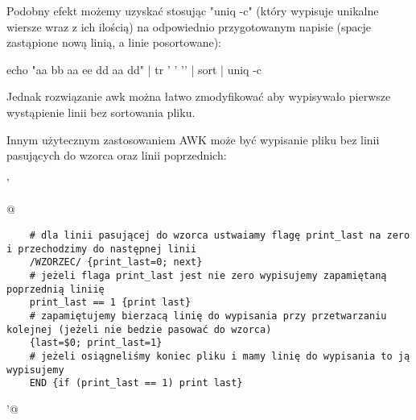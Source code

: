 Podobny efekt możemy uzyskać stosując "uniq -c" (który wypisuje unikalne wiersze wraz z ich ilością)
na odpowiednio przygotowanym napisie (spacje zastąpione nową linią, a linie posortowane):

\begin{CodeFrame*}[bash]{}
echo "aa bb aa ee dd aa dd" | tr ' ' '\n' | sort | uniq -c
\end{CodeFrame*}
Jednak rozwiązanie awk można łatwo zmodyfikować aby wypisywało pierwsze wystąpienie linii bez sortowania pliku.

Innym użytecznym zastosowaniem AWK może być wypisanie pliku bez linii pasujących do wzorca oraz linii poprzednich:

\begin{oframed}\noindent{}\Verb@ '{@\vspace{-0.95em}
\begin{verbatim}
	# dla linii pasującej do wzorca ustwaiamy flagę print_last na zero i przechodzimy do następnej linii
	/WZORZEC/ {print_last=0; next}
	# jeżeli flaga print_last jest nie zero wypisujemy zapamiętaną poprzednią liniię
	print_last == 1 {print last}
	# zapamiętujemy bierzacą linię do wypisania przy przetwarzaniu kolejnej (jeżeli nie bedzie pasować do wzorca)
	{last=$0; print_last=1}
	# jeżeli osiągneliśmy koniec pliku i mamy linię do wypisania to ją wypisujemy
	END {if (print_last == 1) print last}
\end{verbatim}
\vspace{-0.95em}\Verb@}'@\end{oframed}
